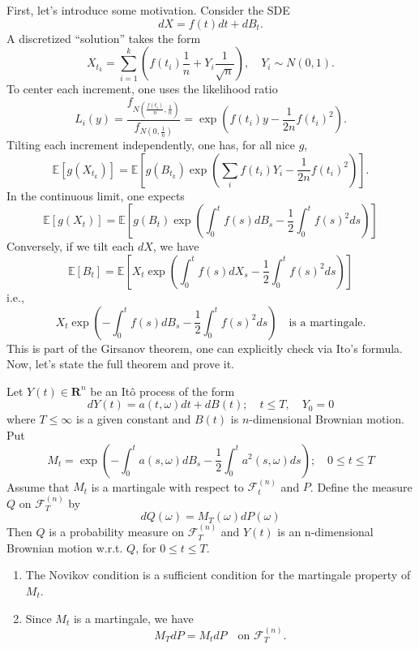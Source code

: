 First, let's introduce some motivation.
Consider the SDE
\[
	dX = f(t) dt + d B_t
.\] 
A discretized ``solution'' takes the form
\[
	X_{t_{k}} = \sum_{i=1}^{k} \left(f(t_i) \frac{1}{n} + Y_i \frac{1}{\sqrt{n} }\right), \quad Y_i \sim N(0,1)
.\] 
To center each increment, one uses the likelihood ratio
\[
	L_i(y) = \frac{f_{N(\frac{f(t_i)}{n}, \frac{1}{n})}}{f_{N(0,\frac{1}{n})}} 
	= \exp \left( f(t_i) y - \frac{1}{2n} f(t_i)^2 \right) 
.\] 
Tilting each increment independently, one has, for all nice $g$,
\[
	\mathbb{E}\left[ g(X_{t_k}) \right] 
	= \mathbb{E}\left[ g(B_{t_k}) \exp \left( \sum_i f(t_i) Y_i - \frac{1}{2n} f(t_i)^2 \right)  \right] 
.\] 
In the continuous limit, one expects
\[
    \mathbb{E}\left[ g(X_{t}) \right] 
    = \mathbb{E}\left[ g(B_{t}) \exp \left( \int_0^t f(s) d B_s - \frac{1}{2} \int_0^t f(s)^2 ds \right)  \right]
\]
Conversely, if we tilt each $dX$, we have
\[
    \mathbb{E}\left[ B_t \right] 
    = \mathbb{E}\left[ X_t \exp \left( \int_0^t f(s) d X_s - \frac{1}{2} \int_0^t f(s)^2 ds \right)  \right] 
\] 
i.e.,
\[
    X_t \exp \left( -\int_0^t f(s) d B_s - \frac{1}{2} \int_0^t f(s)^2 ds \right)
    \quad \text{is a martingale}.
\]
This is part of the Girsanov theorem, one can explicitly check via Ito's formula. Now, let's state the full theorem and prove it.

\begin{theorem}
    Let $Y(t) \in \mathbf{R}^n$ be an Itô process of the form
\[
d Y(t)=a(t, \omega) d t+d B(t) ; \quad t \leq T, \quad Y_0=0
\]
where $T \leq \infty$ is a given constant and $B(t)$ is $n$-dimensional Brownian motion. Put
\[
M_t=\exp \left(-\int_0^t a(s, \omega) d B_s-\frac{1}{2} \int_0^t a^2(s, \omega) d s\right) ; \quad 0 \leq t \leq T
\]
Assume that $M_t$ is a martingale with respect to $\mathcal{F}_t^{(n)}$ and $P$. Define the measure $Q$ on $\mathcal{F}_T^{(n)}$ by
\[
d Q(\omega)=M_T(\omega) d P(\omega)
\]
Then $Q$ is a probability measure on $\mathcal{F}_T^{(n)}$ and $Y(t)$ is an n-dimensional Brownian motion w.r.t. $Q$, for $0 \leq t \leq T$.
\end{theorem}

\begin{remark}
    \begin{enumerate}
        \item The Novikov condition is a sufficient condition for the martingale property of $M_t$.
        \item Since $M_t$ is a martingale, we have
        \[
            M_T dP = M_t dP \quad \text{on } \mathcal{F}_T^{(n)}.
        \]
    \end{enumerate}
\end{remark}

